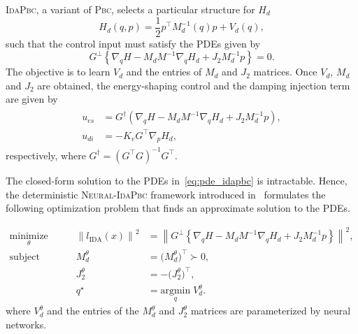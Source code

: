 \textsc{IdaPbc}, a variant of \textsc{Pbc}, selects a particular structure for
$H_d$ 
\begin{equation}
  H_d(q, p) = \frac{1}{2} p^\top M_d^{-1}(q) p + V_d(q),
  \label{eq:idapbc_desired_hamiltonian}
\end{equation}
such that the control input must satisfy the PDEs given by 
\begin{equation}
  G^\perp \left\{ \nabla_qH - M_dM^{-1} \nabla_qH_d + J_2M_d^{-1}p \right\} = 0.
  \label{eq:pde_idapbc}
\end{equation}
The objective is to learn $V_d$ and the entries of $M_d$ and $J_2$ matrices.
Once $V_d$, $M_d$ and $J_2$ are obtained, the energy-shaping control and the
damping injection term are given by
%
\begin{align}
  \begin{split}
  u_{es} &= G^{\dagger} \left(\nabla_qH - M_dM^{-1} \nabla_qH_d + J_2M_d^{-1}p\right), \\
  u_{di} &= -K_v G^\top \nabla_p H_d,
  \end{split}
  \label{eq:idapbc_ues}
\end{align}
%
respectively, where $G^{\dagger} = \left(G^\top G\right)^{-1} G^\top$.

The closed-form solution to the PDEs in~\eqref{eq:pde_idapbc} is intractable.
Hence, the deterministic \textsc{Neural-IdaPbc} framework introduced
in~\cite{neuralidapbc} formulates the following optimization problem that finds
an approximate solution to the PDEs.

\begin{equation}
  \begin{aligned}
      \underset{\theta }{\textrm{minimize}} 
      &&\quad \left\| l_{\textrm{IDA}} (x) \right\|^2 &= \left\| G^\perp \left\{ \nabla_qH - M_dM^{-1} \nabla_qH_d + J_2M_d^{-1}p \right\} \right\|^2, \\
      \textrm{subject to} 
      &&\quad M_d^\theta &= \big( M_d^\theta \big)^\top \succ 0, \\
      &&\quad J_2^\theta &= -\big( J_2^\theta \big)^\top, \\
      &&\quad q^\star &= \underset{q}{\textrm{argmin}}\; V_d^\theta.
  \end{aligned}    
  \label{eq:idapbc_finite_optim}%
\end{equation}
where $V^\theta_d$ and the entries of the $M^\theta_d$ and $J^\theta_2$ matrices
are parameterized by neural networks. 

